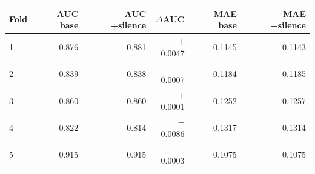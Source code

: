 \begin{tabular}{lrrrrr}
\toprule
Fold & AUC base & AUC +silence & $\Delta$AUC & MAE base & MAE +silence\\
\midrule
1 & 0.876 & 0.881 & $+$0.0047 & 0.1145 & 0.1143\\
2 & 0.839 & 0.838 & $-$0.0007 & 0.1184 & 0.1185\\
3 & 0.860 & 0.860 & $+$0.0001 & 0.1252 & 0.1257\\
4 & 0.822 & 0.814 & $-$0.0086 & 0.1317 & 0.1314\\
5 & 0.915 & 0.915 & $-$0.0003 & 0.1075 & 0.1075\\
\bottomrule
\end{tabular}